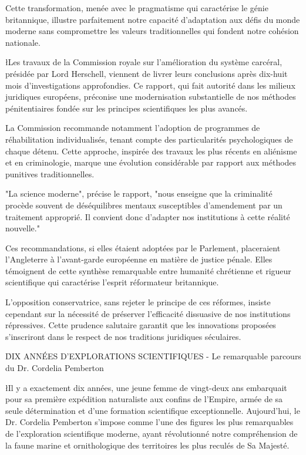 \documentclass{news}
\begin{document}
Cette transformation, menée avec le pragmatisme qui caractérise le génie britannique, illustre parfaitement notre capacité d'adaptation aux défis du monde moderne sans compromettre les valeurs traditionnelles qui fondent notre cohésion nationale.

\l{L}es travaux de la Commission royale sur l'amélioration du système carcéral, présidée par Lord Herschell, viennent de livrer leurs conclusions après dix-huit mois d'investigations approfondies. Ce rapport, qui fait autorité dans les milieux juridiques européens, préconise une modernisation substantielle de nos méthodes pénitentiaires fondée sur les principes scientifiques les plus avancés.

La Commission recommande notamment l'adoption de programmes de réhabilitation individualisés, tenant compte des particularités psychologiques de chaque détenu. Cette approche, inspirée des travaux les plus récents en aliénisme et en criminologie, marque une évolution considérable par rapport aux méthodes punitives traditionnelles.

"La science moderne", précise le rapport, "nous enseigne que la criminalité procède souvent de déséquilibres mentaux susceptibles d'amendement par un traitement approprié. Il convient donc d'adapter nos institutions à cette réalité nouvelle."

Ces recommandations, si elles étaient adoptées par le Parlement, placeraient l'Angleterre à l'avant-garde européenne en matière de justice pénale. Elles témoignent de cette synthèse remarquable entre humanité chrétienne et rigueur scientifique qui caractérise l'esprit réformateur britannique.

L'opposition conservatrice, sans rejeter le principe de ces réformes, insiste cependant sur la nécessité de préserver l'efficacité dissuasive de nos institutions répressives. Cette prudence salutaire garantit que les innovations proposées s'inscriront dans le respect de nos traditions juridiques séculaires.

\h{DIX ANNÉES D'EXPLORATIONS SCIENTIFIQUES - Le remarquable parcours du Dr. Cordelia Pemberton}

\l{I}l y a exactement dix années, une jeune femme de vingt-deux ans embarquait pour sa première expédition naturaliste aux confins de l'Empire, armée de sa seule détermination et d'une formation scientifique exceptionnelle. Aujourd'hui, le Dr. Cordelia Pemberton s'impose comme l'une des figures les plus remarquables de l'exploration scientifique moderne, ayant révolutionné notre compréhension de la faune marine et ornithologique des territoires les plus reculés de Sa Majesté.
\end{document}
